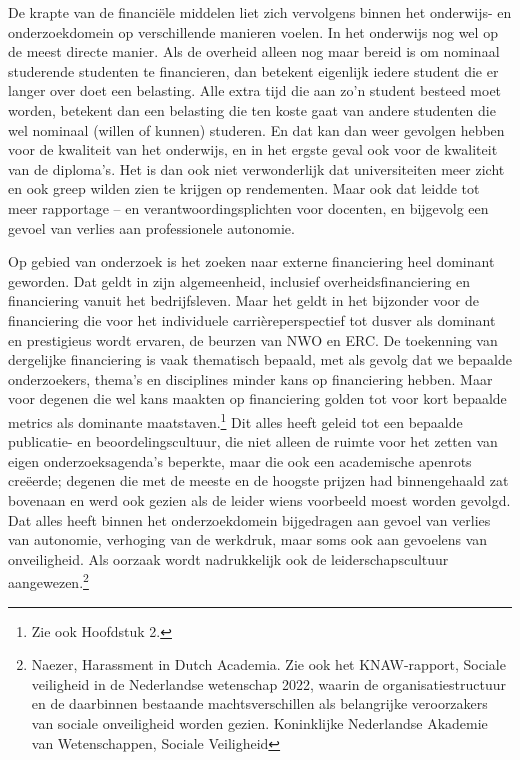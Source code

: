 \documentclass[empirical, authordate, ]{new-jote-article}
\begin{document}
	De krapte van de financiële middelen liet zich vervolgens binnen het onderwijs- en onderzoekdomein op verschillende manieren voelen. In het onderwijs nog wel op de meest directe manier. Als de overheid alleen nog maar bereid is om nominaal studerende studenten te financieren, dan betekent eigenlijk iedere student die er langer over doet een belasting. Alle extra tijd die aan zo'n student besteed moet worden, betekent dan een belasting die ten koste gaat van andere studenten die wel nominaal (willen of kunnen) studeren. En dat kan dan weer gevolgen hebben voor de kwaliteit van het onderwijs, en in het ergste geval ook voor de kwaliteit van de diploma's. Het is dan ook niet verwonderlijk dat universiteiten meer zicht en ook greep wilden zien te krijgen op rendementen. Maar ook dat leidde tot meer rapportage -- en verantwoordingsplichten voor docenten, en bijgevolg een gevoel van verlies aan professionele autonomie.



	Op gebied van onderzoek is het zoeken naar externe financiering heel dominant geworden. Dat geldt in zijn algemeenheid, inclusief overheidsfinanciering en financiering vanuit het bedrijfsleven. Maar het geldt in het bijzonder voor de financiering die voor het individuele carrièreperspectief tot dusver als dominant en prestigieus wordt ervaren, de beurzen van NWO en ERC. De toekenning van dergelijke financiering is vaak thematisch bepaald, met als gevolg dat we bepaalde onderzoekers, thema's en disciplines minder kans op financiering hebben. Maar voor degenen die wel kans maakten op financiering golden tot voor kort bepaalde metrics als dominante maatstaven.\footnote{Zie ook Hoofdstuk 2. } Dit alles heeft geleid tot een bepaalde publicatie- en beoordelingscultuur, die niet alleen de ruimte voor het zetten van eigen onderzoeksagenda's beperkte, maar die ook een academische apenrots creëerde; degenen die met de meeste en de hoogste prijzen had binnengehaald zat bovenaan en werd ook gezien als de leider wiens voorbeeld moest worden gevolgd. Dat alles heeft binnen het onderzoekdomein bijgedragen aan gevoel van verlies van autonomie, verhoging van de werkdruk, maar soms ook aan gevoelens van onveiligheid. Als oorzaak wordt nadrukkelijk ook de leiderschapscultuur aangewezen.\footnote{Naezer, Harassment in Dutch Academia. Zie ook het KNAW-rapport, Sociale veiligheid in de Nederlandse wetenschap 2022, waarin de organisatiestructuur en de daarbinnen bestaande machtsverschillen als belangrijke veroorzakers van sociale onveiligheid worden gezien. Koninklijke Nederlandse Akademie van Wetenschappen, Sociale Veiligheid}
\end{document}
